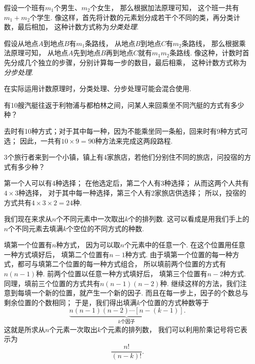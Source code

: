 假设一个班有\(m_1\)个男生、\(m_2\)个女生，
那么根据加法原理可知，
这个班一共有\(m_1 + m_2\)个学生.
像这样，首先将计数的元素划分成若干个不同的类，再分类计数，最后相加，
这种计数方式称为\emph{分类处理}.

假设从地点\(A\)到地点\(B\)有\(m_1\)条路线，
从地点\(B\)到地点\(C\)有\(m_2\)条路线，
那么根据乘法原理可知，
从地点\(A\)先到地点\(B\)再到地点\(C\)就有\(m_1 m_2\)条路线.
像这种，计数时首先分成几个独立的步骤，分别计算每一步的数目，最后相乘，
这种计数方式称为\emph{分步处理}.

在实际运用计数原理时，分类处理、分步处理可能会混合使用.

\begin{example}
有10艘汽艇往返于利物浦与都柏林之间，问某人来回乘坐不同汽艇的方式有多少种？
\begin{solution}
去时有10种方式；对于其中每一种，因为不能乘坐同一条船，回来时有9种方式可选；
因此，一共有\(10 \times 9 = 90\)种方法来完成这两段路程.
\end{solution}
\end{example}

\begin{example}
3个旅行者来到一个小镇，镇上有4家旅店，若他们分别住不同的旅店，问投宿的方式有多少种？
\begin{solution}
第一个人可以有4种选择；
在他选定后，第二个人有3种选择；
从而这两个人共有\(4 \times 3\)种选择，
对于其中每一种选择，第三个人有2家旅店供选择；
所以，投宿的方式共有\(4 \times 3 \times 2 = 24\)种.
\end{solution}
\end{example}

我们现在来求从\(n\)个不同元素中一次取出\(k\)个的排列数.
这可以看成是用我们手上的\(n\)个不同元素去填满\(k\)个空位的不同方式的种数.

填第一个位置有\(n\)种方式，
因为可以取\(n\)个元素中的任意一个.
在这个位置用任意一种方式填好后，
填第二个位置有\(n-1\)种方式.
由于填第一个位置的每一种方式，都可与填第二个位置的每一种方式组合，
所以填前两个位置的方式有\(n(n-1)\)种.
前两个位置以任意一种方式填好后，
填第三个位置有\(n-2\)种方式.
同理，填前三个位置的方式共有\(n(n-1)(n-2)\)种.
继续这样的方法，我们注意到每填一个新的位置，就产生一个新的因子.
而且在每一步上，因子的个数总与剩余位置的个数相同；
于是，我们得出填满\(k\)个位置的方式种数等于\begin{equation*}
	\underbrace{n(n-1)(n-2)\dotsm[n-(k-1)]}_{\text{$k$个因子}}.
\end{equation*}
这就是所求从\(n\)个元素一次取出\(k\)个元素的排列数，
我们可以利用阶乘记号将它表示为\begin{equation*}
	\frac{n!}{(n-k)!}.
\end{equation*}

